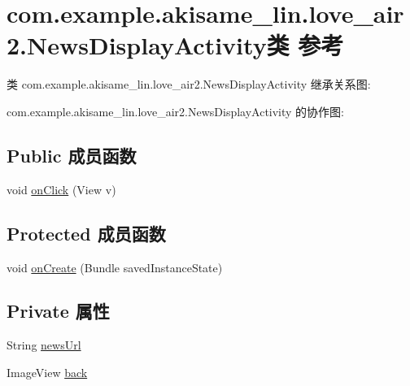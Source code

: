 \hypertarget{classcom_1_1example_1_1akisame__lin_1_1love__air2_1_1_news_display_activity}{}\section{com.\+example.\+akisame\+\_\+lin.\+love\+\_\+air2.\+News\+Display\+Activity类 参考}
\label{classcom_1_1example_1_1akisame__lin_1_1love__air2_1_1_news_display_activity}


类 com.\+example.\+akisame\+\_\+lin.\+love\+\_\+air2.\+News\+Display\+Activity 继承关系图\+:


com.\+example.\+akisame\+\_\+lin.\+love\+\_\+air2.\+News\+Display\+Activity 的协作图\+:
\subsection*{Public 成员函数}
\begin{DoxyCompactItemize}
\item 
void \mbox{\hyperlink{classcom_1_1example_1_1akisame__lin_1_1love__air2_1_1_news_display_activity_a1753dae6fa79bf023aecb1017aafbb10}{on\+Click}} (View v)
\end{DoxyCompactItemize}
\subsection*{Protected 成员函数}
\begin{DoxyCompactItemize}
\item 
void \mbox{\hyperlink{classcom_1_1example_1_1akisame__lin_1_1love__air2_1_1_news_display_activity_a7452cd2b53c11239a5f18a71d2b30bc9}{on\+Create}} (Bundle saved\+Instance\+State)
\end{DoxyCompactItemize}
\subsection*{Private 属性}
\begin{DoxyCompactItemize}
\item 
String \mbox{\hyperlink{classcom_1_1example_1_1akisame__lin_1_1love__air2_1_1_news_display_activity_a4cf5b24309fc1821d739806e5d37aff4}{news\+Url}}
\item 
Image\+View \mbox{\hyperlink{classcom_1_1example_1_1akisame__lin_1_1love__air2_1_1_news_display_activity_a9ffdc8f7c676433e511e3e8c8da1c96c}{back}}
\end{DoxyCompactItemize}


